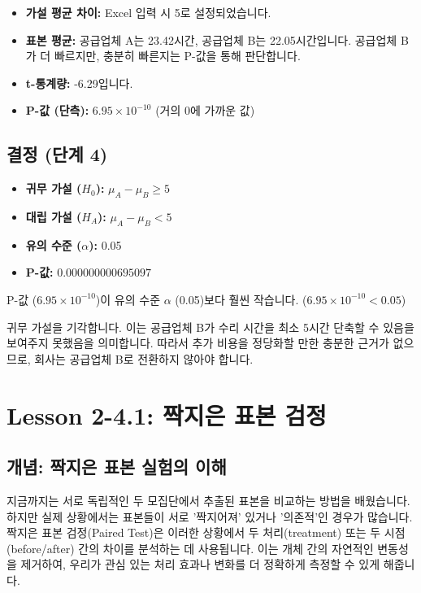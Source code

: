 \documentclass[11pt,a4paper]{article}
\theoremstyle{definition}
\begin{document}
\begin{itemize}
    \item \textbf{가설 평균 차이:} Excel 입력 시 5로 설정되었습니다.
    \item \textbf{표본 평균:} 공급업체 A는 23.42시간, 공급업체 B는 22.05시간입니다. 공급업체 B가 더 빠르지만, 충분히 빠른지는 P-값을 통해 판단합니다.
    \item \textbf{t-통계량:} -6.29입니다.
    \item \textbf{P-값 (단측):} $6.95 \times 10^{-10}$ (거의 0에 가까운 값)
\end{itemize}

\subsection{결정 (단계 4)}
\begin{itemize}
    \item \textbf{귀무 가설 ($H_0$):} $\mu_A - \mu_B \ge 5$
    \item \textbf{대립 가설 ($H_A$):} $\mu_A - \mu_B < 5$
    \item \textbf{유의 수준 ($\alpha$):} 0.05
    \item \textbf{P-값:} $0.000000000695097$
\end{itemize}
P-값 ($6.95 \times 10^{-10}$)이 유의 수준 $\alpha$ (0.05)보다 훨씬 작습니다.
($6.95 \times 10^{-10} < 0.05$)

\begin{summarybox}[title=결론]
귀무 가설을 기각합니다. 이는 공급업체 B가 수리 시간을 최소 5시간 단축할 수 있음을 보여주지 못했음을 의미합니다. 따라서 추가 비용을 정당화할 만한 충분한 근거가 없으므로, 회사는 공급업체 B로 전환하지 않아야 합니다.
\end{summarybox}

\newpage
\section{Lesson 2-4.1: 짝지은 표본 검정}

\subsection{개념: 짝지은 표본 실험의 이해}
지금까지는 서로 독립적인 두 모집단에서 추출된 표본을 비교하는 방법을 배웠습니다. 하지만 실제 상황에서는 표본들이 서로 '짝지어져' 있거나 '의존적'인 경우가 많습니다. 짝지은 표본 검정(Paired Test)은 이러한 상황에서 두 처리(treatment) 또는 두 시점(before/after) 간의 차이를 분석하는 데 사용됩니다. 이는 개체 간의 자연적인 변동성을 제거하여, 우리가 관심 있는 처리 효과나 변화를 더 정확하게 측정할 수 있게 해줍니다.
\end{document}
